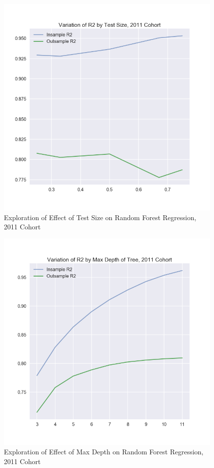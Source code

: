 \documentclass[10pt,twocolumn]{article}
\begin{document}
\begin{figure}[!t]
  \begin{center}
    \includegraphics[width=\textwidth]{Testsize.png}
  \end{center}

  \caption{\Figure Exploration of Effect of Test Size on Random Forest Regression, 2011 Cohort}
  \label{Testsize}
\end{figure}

\begin{figure}[!t]
  \begin{center}
    \includegraphics[width=\textwidth]{Max_Depth.png}
  \end{center}

  \caption{\Figure Exploration of Effect of Max Depth on Random Forest Regression, 2011 Cohort}
  \label{maxdepth}
\end{figure}
\end{document}
